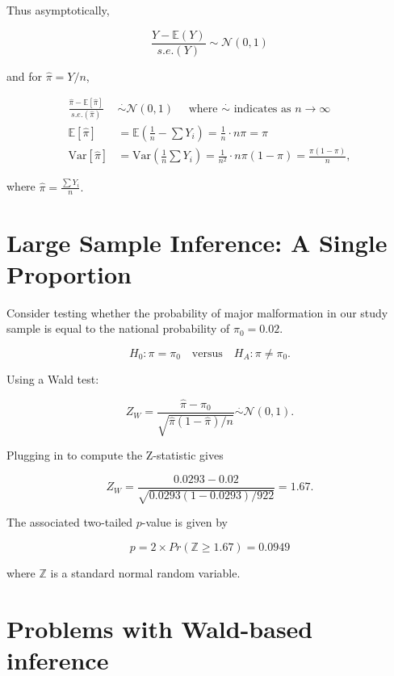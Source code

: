 \documentclass[
  letterpaper,
  DIV=11,
  numbers=noendperiod]{scrreport}
\begin{document}
Thus asymptotically,

\[
\frac{Y - \mathbb E(Y)}{s.e.(Y)} \sim \mathcal N(0, 1)
\]

and for \(\hat \pi = Y/n\),

\[
\begin{aligned}
\frac{\hat \pi - \mathbb E[\hat \pi]}{s.e.(\hat \pi)} & \stackrel{\cdot}{\sim} \mathcal N(0,1) \quad \text{ where } \stackrel{\cdot}{\sim} \text{ indicates as } n \to \infty \\ 
\mathbb E[\hat \pi] & = \mathbb E(\frac{1}{n} - \sum Y_i) = \frac{1}{n} \cdot n \pi = \pi \\ 
\text{Var}[\hat \pi] & = \text{Var}\left(\frac{1}{n} \sum Y_i\right) = \frac{1}{n^2} \cdot n \pi (1-\pi) = \frac{\pi (1-\pi)}{n},
\end{aligned}
\]

where \(\hat \pi = \frac{\sum Y_i}{n}.\)

\hypertarget{large-sample-inference-a-single-proportion}{%
\section{Large Sample Inference: A Single
Proportion}\label{large-sample-inference-a-single-proportion}}

Consider testing whether the probability of major malformation in our
study sample is equal to the national probability of \(\pi_0 = 0.02\).

\[
H_0 \colon \pi = \pi_0 \quad \text{versus} \quad H_A \colon \pi \neq \pi_0.
\]

Using a Wald test:

\[
Z_W = \frac{\hat \pi - \pi_0}{\sqrt{\hat \pi (1 - \hat \pi) / n }} \stackrel \cdot \sim \mathcal N(0,1).
\]

Plugging in to compute the Z-statistic gives

\[
Z_W = \frac{0.0293 − 0.02}{\sqrt{0.0293(1 − 0.0293)/922}} = 1.67.
\]

The associated two-tailed \(p\)-value is given by

\[
p = 2 \times Pr(\mathbb Z \geq 1.67) = 0.0949
\]

where \(\mathbb Z\) is a standard normal random variable.

\hypertarget{problems-with-wald-based-inference}{%
\section{Problems with Wald-based
inference}\label{problems-with-wald-based-inference}}
\end{document}
